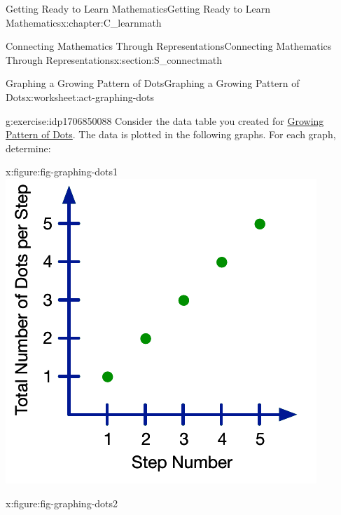 \documentclass[oneside,10pt,]{book}
\numberwithin{equation}{chapter}
\begin{document}
\begin{chapterptx}{Getting Ready to Learn Mathematics}{}{Getting Ready to Learn Mathematics}{}{}{x:chapter:C_learnmath}
\begin{sectionptx}{Connecting Mathematics Through Representations}{}{Connecting Mathematics Through Representations}{}{}{x:section:S_connectmath}
\begin{worksheet-subsection}{Graphing a Growing Pattern of Dots}{}{Graphing a Growing Pattern of Dots}{}{}{x:worksheet:act-graphing-dots}
\begin{divisionexercise}{1}{}{}{g:exercise:idp1706850088}
Consider the data table you created for \hyperref[x:worksheet:act-growing-dots]{Growing Pattern of Dots}. The data is plotted in the following graphs. For each graph, determine: \begin{sidebyside}{4}{0}{0}{0}%
\begin{sbspanel}{0.25}%
\begin{figureptx}{}{x:figure:fig-graphing-dots1}{}%
\includegraphics[width=\linewidth]{external/graphing-dots1.pdf}
\tcblower
\end{figureptx}%
\end{sbspanel}%
\begin{sbspanel}{0.25}%
\begin{figureptx}{}{x:figure:fig-graphing-dots2}{}%

\end{figureptx}
\end{sbspanel}
\end{sidebyside}
\end{divisionexercise}
\end{worksheet-subsection}
\end{sectionptx}
\end{chapterptx}
\end{document}
